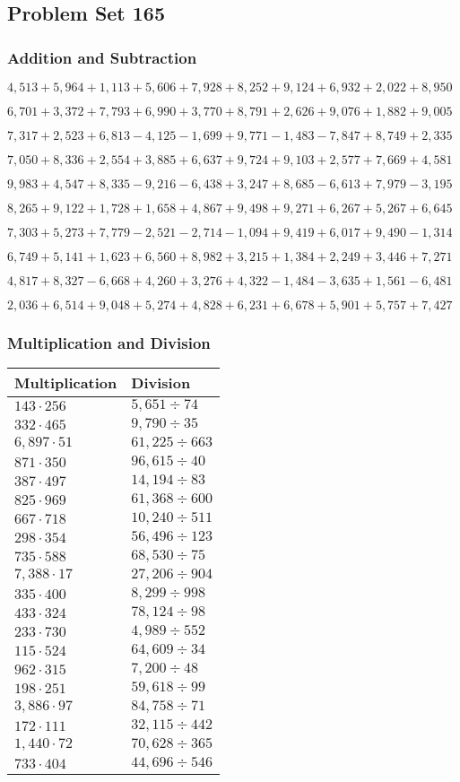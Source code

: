 \hypertarget{problem-set-165}{%
\subsection{Problem Set 165}\label{problem-set-165}}

\hypertarget{addition-and-subtraction}{%
\subsubsection{Addition and
Subtraction}\label{addition-and-subtraction}}

\(4,513+5,964+1,113+5,606+7,928+8,252+9,124+6,932+2,022+8,950\)

\(6,701+3,372+7,793+6,990+3,770+8,791+2,626+9,076+1,882+9,005\)

\(7,317+2,523+6,813-4,125-1,699+9,771-1,483-7,847+8,749+2,335\)

\(7,050+8,336+2,554+3,885+6,637+9,724+9,103+2,577+7,669+4,581\)

\(9,983+4,547+8,335-9,216-6,438+3,247+8,685-6,613+7,979-3,195\)

\(8,265+9,122+1,728+1,658+4,867+9,498+9,271+6,267+5,267+6,645\)

\(7,303+5,273+7,779-2,521-2,714-1,094+9,419+6,017+9,490-1,314\)

\(6,749+5,141+1,623+6,560+8,982+3,215+1,384+2,249+3,446+7,271\)

\(4,817+8,327-6,668+4,260+3,276+4,322-1,484-3,635+1,561-6,481\)

\(2,036+6,514+9,048+5,274+4,828+6,231+6,678+5,901+5,757+7,427\)

\hypertarget{multiplication-and-division}{%
\subsubsection{Multiplication and
Division}\label{multiplication-and-division}}

\begin{longtable}[]{@{}ll@{}}
\toprule
Multiplication & Division\tabularnewline
\midrule
\endhead
\(143\cdot256\) & \(5,651÷74\)\tabularnewline
\(332\cdot465\) & \(9,790÷35\)\tabularnewline
\(6,897\cdot51\) & \(61,225÷663\)\tabularnewline
\(871\cdot350\) & \(96,615÷40\)\tabularnewline
\(387\cdot497\) & \(14,194÷83\)\tabularnewline
\(825\cdot969\) & \(61,368÷600\)\tabularnewline
\(667\cdot718\) & \(10,240÷511\)\tabularnewline
\(298\cdot354\) & \(56,496÷123\)\tabularnewline
\(735\cdot588\) & \(68,530÷75\)\tabularnewline
\(7,388\cdot17\) & \(27,206÷904\)\tabularnewline
\(335\cdot400\) & \(8,299÷998\)\tabularnewline
\(433\cdot324\) & \(78,124÷98\)\tabularnewline
\(233\cdot730\) & \(4,989÷552\)\tabularnewline
\(115\cdot524\) & \(64,609÷34\)\tabularnewline
\(962\cdot315\) & \(7,200÷48\)\tabularnewline
\(198\cdot251\) & \(59,618÷99\)\tabularnewline
\(3,886\cdot97\) & \(84,758÷71\)\tabularnewline
\(172\cdot111\) & \(32,115÷442\)\tabularnewline
\(1,440\cdot72\) & \(70,628÷365\)\tabularnewline
\(733\cdot404\) & \(44,696÷546\)\tabularnewline
\bottomrule
\end{longtable}

